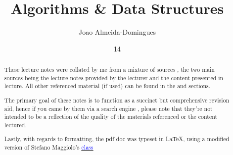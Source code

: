 \documentclass[english,course]{Notes}
\title{Algorithms \& Data Structures}
\author{Joao Almeida-Domingues}
\date{14}{01}{2020}
\begin{document}

\begin{abstract}
	\par{These lecture notes were collated by me from a mixture of sources , the two main sources being the lecture notes provided by the lecturer and the
content presented in-lecture. All other referenced material (if used) can be found in the  and  sections.}
	\par{The primary goal of these notes is to function as a succinct but comprehensive revision aid, hence if you came by them via a search engine , please note
that they're not intended to be a reflection of the quality of the materials referenced or the content lectured.}
	\par{Lastly, with regards to formatting, the pdf doc was typeset in \LaTeX , using a modified version of Stefano Maggiolo's \href{http://blog.poormansmath.net/
latex-class-for-lecture-notes/}{\underline{\textcolor{blue}{class}}}}
\end{abstract}
\newpage

\lstset{language=Java}
%
%
%

%
%
\newpage
\nocite{*}
\printbibliography

\end{document}
